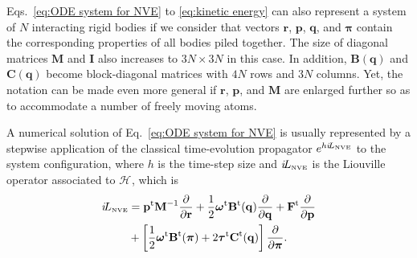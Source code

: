 \documentclass[
	aip,
	jcp,
	reprint,
]{revtex4-1}
\newcommand{\mt}[1]{\boldsymbol{\mathbf{#1}}}          %
\newcommand{\vt}[1]{\boldsymbol{\mathbf{#1}}}          %
\newcommand{\tr}[1]{#1^\text{t}}                       %
\newcommand{\diff}[2]{\frac{\partial #1}{\partial #2}} %
\newcommand{\Ham}[1]{{\mathcal H}_\text{#1}}           %
\newcommand{\Liu}[1]{i\!L_\text{#1}}                   %
\newcommand{\timestep}{h}
\begin{document}
Eqs.~\eqref{eq:ODE system for NVE} to \eqref{eq:kinetic energy} can also represent a system of $N$ interacting rigid bodies if we consider that vectors $\vt r$, $\vt p$, $\vt q$, and $\vt \pi$ contain the corresponding properties of all bodies piled together.
The size of diagonal matrices $\mt M$ and $\mt I$ also increases to $3N \times 3N$ in this case.
In addition, $\mt B(\vt q)$ and $\mt C(\vt q)$ become block-diagonal matrices with $4N$ rows and $3N$ columns.
Yet, the notation can be made even more general if $\vt r$, $\vt p$, and $\mt M$ are enlarged further so as to accommodate a number of freely moving atoms.

A numerical solution of Eq.~\eqref{eq:ODE system for NVE} is usually represented by a stepwise application of the classical time-evolution propagator \cite{Tuckerman_2010} $e^{\timestep \Liu{\tiny NVE}}$ to the system configuration, where $\timestep$ is the time-step size and $\Liu{\tiny NVE}$ is the Liouville operator associated to $\Ham{}$, which is
\begin{equation}
\label{eq:Lioville operator}
\begin{split}
\Liu{\tiny NVE} &= \tr{\vt p} {\mt M}^{-1} \diff{}{\vt r} + \frac{1}{2} \tr{\vt \omega} \tr{\mt B}(\vt q) \diff{}{\vt q} + \tr{\vt F} \diff{}{\vt p} \\
&+ \left[ \frac{1}{2} \tr{\vt \omega} \tr{\mt B}(\vt \pi) + 2 \tr{\vt \tau} \tr{\mt C}(\vt q) \right] \diff{}{\vt \pi}.
\end{split}
\end{equation}
\end{document}
